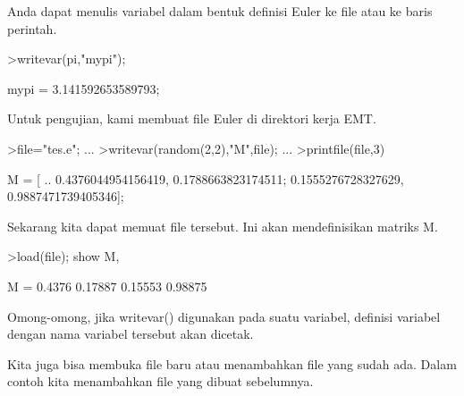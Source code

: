 \documentclass[a4paper,10pt]{article}
\begin{document}
\begin{eulernotebook}
\begin{eulercomment}
\begin{eulercomment}
\begin{eulercomment}
\begin{eulercomment}
\begin{eulercomment}
\begin{eulercomment}
\begin{eulercomment}
\begin{eulercomment}
\begin{eulercomment}
\begin{eulercomment}
\begin{eulercomment}
\begin{eulercomment}
\begin{eulercomment}
\begin{eulercomment}
\begin{eulercomment}
\begin{eulercomment}
\begin{eulercomment}
Anda dapat menulis variabel dalam bentuk definisi Euler ke file atau
ke baris perintah.
\end{eulercomment}
\begin{eulerprompt}
>writevar(pi,"mypi");
\end{eulerprompt}
\begin{euleroutput}
  mypi = 3.141592653589793;
\end{euleroutput}
\begin{eulercomment}
Untuk pengujian, kami membuat file Euler di direktori kerja EMT.
\end{eulercomment}
\begin{eulerprompt}
>file="tes.e"; ...
>writevar(random(2,2),"M",file); ...
>printfile(file,3)
\end{eulerprompt}
\begin{euleroutput}
  M = [ ..
  0.4376044954156419, 0.1788663823174511;
  0.1555276728327629, 0.9887471739405346];
\end{euleroutput}
\begin{eulercomment}
Sekarang kita dapat memuat file tersebut. Ini akan mendefinisikan
matriks M.
\end{eulercomment}
\begin{eulerprompt}
>load(file); show M,
\end{eulerprompt}
\begin{euleroutput}
  M = 
     0.4376   0.17887 
    0.15553   0.98875 
\end{euleroutput}
\begin{eulercomment}
Omong-omong, jika writevar() digunakan pada suatu variabel, definisi
variabel dengan nama variabel tersebut akan dicetak.
\end{eulercomment}
\begin{eulercomment}
Kita juga bisa membuka file baru atau menambahkan file yang sudah ada.
Dalam contoh kita menambahkan file yang dibuat sebelumnya.
\end{eulercomment}
\begin{eulerprompt}

\end{eulerprompt}
\end{eulercomment}
\end{eulercomment}
\end{eulercomment}
\end{eulercomment}
\end{eulercomment}
\end{eulercomment}
\end{eulercomment}
\end{eulercomment}
\end{eulercomment}
\end{eulercomment}
\end{eulercomment}
\end{eulercomment}
\end{eulercomment}
\end{eulercomment}
\end{eulercomment}
\end{eulercomment}
\end{eulernotebook}
\end{document}

